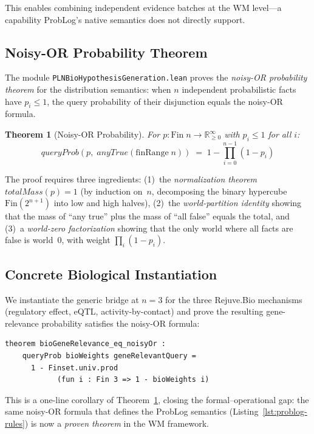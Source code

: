 \documentclass[]{article}
\newtheorem{theorem}{Theorem}
\newcommand{\code}[1]{\texttt{#1}}
\begin{document}
\noindent
This enables combining independent evidence batches at the WM level---a capability
ProbLog's native semantics does not directly support.

\subsection{Noisy-OR Probability Theorem}

The module \code{PLNBioHypothesisGeneration.lean} proves the \emph{noisy-OR
probability theorem} for the distribution semantics: when $n$ independent
probabilistic facts have $p_i \le 1$, the query probability of their disjunction
equals the noisy-OR formula.

\begin{theorem}[Noisy-OR Probability]
\label{thm:noisy-or}
For $p : \mathrm{Fin}\;n \to \mathbb{R}_{\ge 0}^\infty$ with $p_i \le 1$ for all $i$:
\[
  \mathit{queryProb}(p,\; \mathit{anyTrue}(\mathrm{finRange}\;n))
  \;=\; 1 - \prod_{i=0}^{n-1} (1 - p_i)
\]
\end{theorem}

\noindent
The proof requires three ingredients: (1)~the \emph{normalization theorem}
$\mathit{totalMass}(p) = 1$ (by induction on~$n$, decomposing the binary
hypercube $\mathrm{Fin}(2^{n+1})$ into low and high halves), (2)~the
\emph{world-partition identity} showing that the mass of ``any true'' plus
the mass of ``all false'' equals the total, and (3)~a \emph{world-zero
factorization} showing that the only world where all facts are false is
world~0, with weight $\prod_i (1 - p_i)$.

\subsection{Concrete Biological Instantiation}

We instantiate the generic bridge at $n = 3$ for the three
Rejuve.Bio mechanisms (regulatory effect, eQTL, activity-by-contact) and
prove the resulting gene-relevance probability satisfies the noisy-OR formula:

\begin{lstlisting}[caption={Bio model noisy-OR (Lean~4)},label=lst:bio-noisy-or]
theorem bioGeneRelevance_eq_noisyOr :
    queryProb bioWeights geneRelevantQuery =
      1 - Finset.univ.prod
            (fun i : Fin 3 => 1 - bioWeights i)
\end{lstlisting}

\noindent
This is a one-line corollary of Theorem~\ref{thm:noisy-or},
closing the formal--operational gap: the same noisy-OR formula that defines
the ProbLog semantics (Listing~\ref{lst:problog-rules}) is now a
\emph{proven theorem} in the WM framework.
\end{document}
